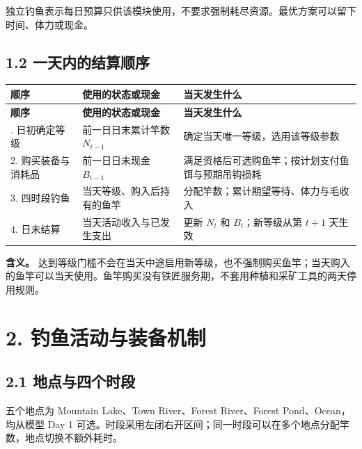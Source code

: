 \documentclass[11pt,a4paper]{article}
\begin{document}
独立钓鱼表示每日预算只供该模块使用，不要求强制耗尽资源。最优方案可以留下时间、体力或现金。\par

\subsection*{1.2 一天内的结算顺序}

{\small\begin{longtable}{L{0.22\dimexpr\textwidth-30pt\relax}L{0.24\dimexpr\textwidth-30pt\relax}L{0.54\dimexpr\textwidth-30pt\relax}}\toprule
\textbf{顺序} & \textbf{使用的状态或现金} & \textbf{当天发生什么}\\\midrule\endfirsthead
\textbf{顺序} & \textbf{使用的状态或现金} & \textbf{当天发生什么}\\\midrule\endhead
\bottomrule{}. 日初确定等级 & 前一日日末累计竿数 $N_{t-1}$ & 确定当天唯一等级，选用该等级参数\\
2. 购买装备与消耗品 & 前一日日末现金 $B_{t-1}$ & 满足资格后可选购鱼竿；按计划支付鱼饵与预期吊钩损耗\\
3. 四时段钓鱼 & 当天等级、购入后持有的鱼竿 & 分配竿数；累计期望等待、体力与毛收入\\
4. 日末结算 & 当天活动收入与已发生支出 & 更新 $N_t$ 和 $B_t$；新等级从第 $t+1$ 天生效\\
\end{longtable}}

\textbf{含义。} 达到等级门槛不会在当天中途启用新等级，也不强制购买鱼竿；当天购入的鱼竿可以当天使用。鱼竿购买没有铁匠服务期，不套用种植和采矿工具的两天停用规则。\par

\section*{\color{modelblue}2. 钓鱼活动与装备机制}

\subsection*{2.1 地点与四个时段}

五个地点为 Mountain Lake、Town River、Forest River、Forest Pond、Ocean，均从模型 Day 1 可选。时段采用左闭右开区间；同一时段可以在多个地点分配竿数，地点切换不额外耗时。\par
\end{document}
